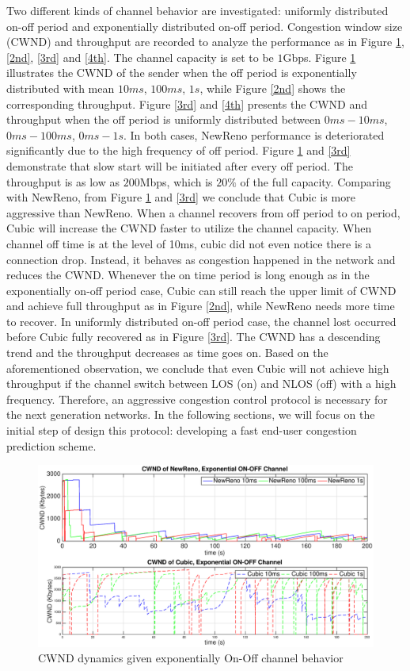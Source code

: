 Two different kinds of channel behavior are investigated: uniformly distributed on-off period and exponentially distributed on-off period. Congestion window size (CWND) and throughput are recorded to analyze the performance as in Figure \ref{1st}, \ref{2nd}, \ref{3rd} and \ref{4th}.  The channel capacity is set to be $1$Gbps. Figure \ref{1st} illustrates the CWND of the sender when the off period is exponentially distributed with mean $10ms$, $100ms$, $1s$, while Figure \ref{2nd} shows the corresponding throughput. Figure \ref{3rd} and \ref{4th} presents the CWND and throughput when the off period is uniformly distributed between $0ms - 10ms$, $0ms - 100ms$, $0ms - 1s$. In both cases, NewReno performance is deteriorated significantly due to the high frequency of off period. Figure \ref{1st} and \ref{3rd} demonstrate that slow start will be initiated after every off period. The throughput is as low as $200$Mbps, which is $20\%$ of the full capacity. Comparing with NewReno, from Figure \ref{1st} and \ref{3rd} we conclude that Cubic is more aggressive than NewReno. When a channel recovers from off period to on period, Cubic will increase the CWND faster to utilize the channel capacity.  When channel off time is at the level of 10ms, cubic did not even notice there is a connection drop. Instead, it behaves as congestion happened in the network and reduces the CWND. Whenever the on time period is long enough as in the exponentially on-off period case, Cubic can still reach the upper limit of CWND and achieve full throughput as in Figure \ref{2nd}, while NewReno needs more time to recover. In uniformly distributed on-off period case, the channel lost occurred before Cubic fully recovered as in Figure \ref{3rd}. The CWND has a descending trend and the throughput decreases as time goes on. Based on the aforementioned observation, we conclude that even Cubic will not achieve high throughput if the channel switch between LOS (on) and NLOS (off) with a high frequency. Therefore, an aggressive congestion control protocol is necessary for the next generation networks. In the following sections, we will focus on the initial step of design this protocol: developing a fast end-user congestion prediction scheme.
\begin{figure}
\centering
\includegraphics[width=14cm]{1.eps}
\caption{CWND dynamics given exponentially On-Off channel behavior}
\label{1st}
\end{figure}
